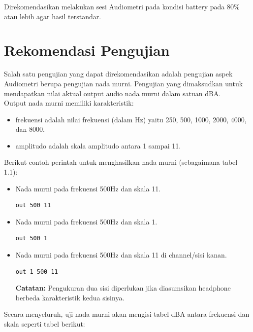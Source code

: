 \documentclass[12pt]{book}
\begin{document}
	Direkomendasikan melakukan sesi Audiometri pada kondisi battery pada 80\% atau lebih agar hasil terstandar.

	\newpage
    \section{Rekomendasi Pengujian}

    Salah satu pengujian yang dapat direkomendasikan adalah pengujian aspek Audiometri berupa pengujian nada murni.
    Pengujian yang dimaksudkan untuk mendapatkan nilai aktual output audio nada murni dalam satuan dBA.\\

    Output nada murni memiliki karakteristik:
    \begin{itemize}
    	\item frekuensi adalah nilai frekuensi (dalam Hz) yaitu 250, 500, 1000, 2000, 4000, dan 8000.
    	\item amplitudo adalah skala amplitudo antara 1 sampai 11.
    \end{itemize}

	Berikut contoh perintah untuk menghasilkan nada murni (sebagaimana tabel 1.1):

	\begin{itemize}
		\item Nada murni pada frekuensi 500Hz dan skala 11.
    	\begin{verbatim}
out 500 11
		\end{verbatim}

		\item Nada murni pada frekuensi 500Hz dan skala 1.
		\begin{verbatim}
out 500 1
		\end{verbatim}

		\item Nada murni pada frekuensi 500Hz dan skala 11 di channel/sisi kanan.
		\begin{verbatim}
out 1 500 11
		\end{verbatim}

		\textbf{Catatan:} Pengukuran dua sisi diperlukan jika diasumsikan headphone berbeda karakteristik kedua sisinya.
	\end{itemize}

	Secara menyeluruh, uji nada murni akan mengisi tabel dBA antara frekuensi dan skala seperti tabel berikut:
\end{document}
